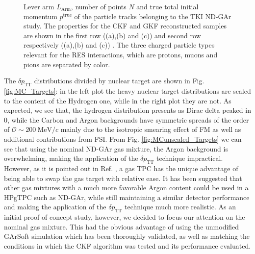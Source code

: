 \begin{figure}[t]
\begin{subfigure}[b]{0.32\textwidth}
         \caption{}
         \label{fig:GAr_pparticles}
     \end{subfigure}
        \caption{ Lever arm $L_\text{Arm}$, number of points $N$ and true total initial momentum $p^\text{true}$ of the particle tracks belonging to the TKI ND-GAr study. The properties for the CKF and GKF reconstructed samples are shown in the first row ((a),(b) and (c)) and second row respectively ((a),(b) and (c)) . The three charged particle types relevant for the RES interactions, which are protons, muons and pions are separated by color. } \label{fig:ALICEStRecoGAr_particles}
\end{figure}

The $\delta p_\text{TT}$ distributions divided by nuclear target are shown in Fig. \ref{fig:MC_Targets}: in the left plot the heavy nuclear target distributions are scaled to the content of the Hydrogen one, while in the right plot they are not. As expected, we see that, the hydrogen distribution presents as Dirac delta peaked in 0, while the Carbon and Argon backgrounds have symmetric spreads of the order of $\mathcal{O}\sim 200 \ \text{MeV}/c$ mainly due to the isotropic smearing effect of FM as well as additional contributions from FSI. From Fig. \ref{fig:MCunscaled_Targets} we can see that using the nominal ND-GAr gas mixture, the Argon background is overwhelming, making the application of the $\delta p_\text{TT}$ technique impractical. However, as it is pointed out in Ref. \cite{Lu}, a gas TPC has the unique advantage of being able to swap the gas target with relative ease. It has been suggested that other gas mixtures with a much more favorable Argon content could be used in a HPgTPC such as ND-GAr, while still maintaining a similar detector performance and making the application of the $\delta p_\text{TT}$ technique much more realistic. As an initial proof of concept study, however, we decided to focus our attention on the nominal gas mixture. This had the obvious advantage of using the unmodified GArSoft simulation which has been thoroughly validated, as well as matching the conditions in which the CKF algorithm was tested and its performance evaluated.


